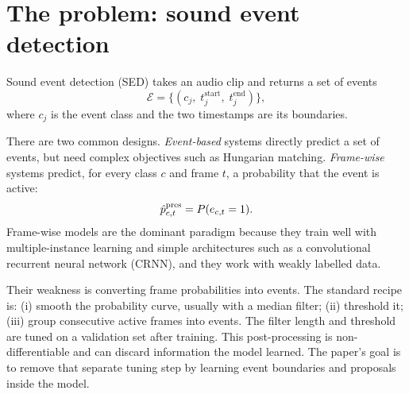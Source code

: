\section{The problem: sound event detection}

Sound event detection (SED) takes an audio clip and returns a set of events
\begin{equation}
\mathcal{E} = \{(c_j,\; t^{\mathrm{start}}_j,\; t^{\mathrm{end}}_j)\},
\end{equation}
where $c_j$ is the event class and the two timestamps are its boundaries.

There are two common designs. \emph{Event-based} systems directly predict a set
of events, but need complex objectives such as Hungarian matching.
\emph{Frame-wise} systems predict, for every class $c$ and frame $t$, a
probability that the event is active:
\begin{equation}
\hat p^{\mathrm{pres}}_{c,t} = P(e_{c,t}=1).
\end{equation}
Frame-wise models are the dominant paradigm because they train well with
multiple-instance learning and simple architectures such as a convolutional
recurrent neural network (CRNN), and they work with weakly labelled data.

Their weakness is converting frame probabilities into events. The standard
recipe is: (i) smooth the probability curve, usually with a median filter;
(ii) threshold it; (iii) group consecutive active frames into events. The filter
length and threshold are tuned on a validation set after training. This
post-processing is non-differentiable and can discard information the model
learned. The paper's goal is to remove that separate tuning step by learning
event boundaries and proposals inside the model.

